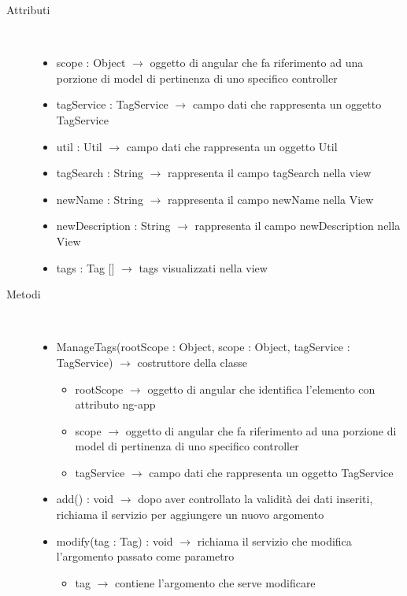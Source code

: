 \begin{description}
\item[Attributi] \hfill \\
\vspace{-7mm}
\begin{itemize}
	\item scope : Object $\rightarrow$ oggetto di angular che fa riferimento ad una porzione di model di pertinenza di uno specifico controller
	\item tagService : TagService $\rightarrow$ campo dati che rappresenta un oggetto TagService
	\item util : Util $\rightarrow$ campo dati che rappresenta un oggetto Util
	\item tagSearch : String $\rightarrow$ rappresenta il campo tagSearch nella view
	\item newName : String $\rightarrow$ rappresenta il campo newName nella View
	\item newDescription : String $\rightarrow$ rappresenta il campo newDescription nella View
	\item tags : Tag [] $\rightarrow$ tags visualizzati nella view
\end{itemize}

\item[Metodi] \hfill \\
\vspace{-7mm}
\begin{itemize}
	\item ManageTags(rootScope : Object, scope : Object, tagService : TagService) $\rightarrow$ costruttore della classe\begin{itemize}
		\item rootScope $\rightarrow$ oggetto di angular che identifica l’elemento con attributo ng-app
		\item scope $\rightarrow$ oggetto di angular che fa riferimento ad una porzione di model di pertinenza di uno specifico controller
		\item tagService $\rightarrow$ campo dati che rappresenta un oggetto TagService 
	\end{itemize}
	
	\item add() : void $\rightarrow$ dopo aver controllato la validità dei dati inseriti, richiama il servizio per aggiungere un nuovo argomento
	\item modify(tag : Tag) : void $\rightarrow$ richiama il servizio che modifica l'argomento passato come parametro\begin{itemize}
		\item tag $\rightarrow$ contiene l'argomento che serve modificare 
	\end{itemize}
	

\end{itemize}
\end{description}
